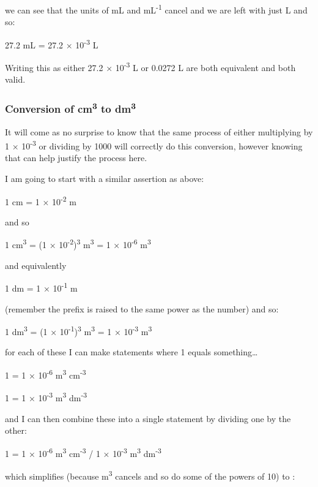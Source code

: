 \documentclass[
]{book}
\begin{document}
we can see that the units of mL and mL\textsuperscript{-1} cancel and we are left with just L and so:

27.2 mL = 27.2 × 10\textsuperscript{-3} L

Writing this as either 27.2 × 10\textsuperscript{-3} L or 0.0272 L are both equivalent and both valid.

\hypertarget{conversion-of-cm3-to-dm3}{%
\subsubsection{\texorpdfstring{Conversion of cm\textsuperscript{3} to dm\textsuperscript{3}}{Conversion of cm3 to dm3}}\label{conversion-of-cm3-to-dm3}}

It will come as no surprise to know that the same process of either multiplying by 1 × 10\textsuperscript{-3} or dividing by 1000 will correctly do this conversion, however knowing that can help justify the process here.

I am going to start with a similar assertion as above:

1 cm = 1 × 10\textsuperscript{-2} m

and so

1 cm\textsuperscript{3} = (1 × 10\textsuperscript{-2})\textsuperscript{3} m\textsuperscript{3} = 1 × 10\textsuperscript{-6} m\textsuperscript{3}

and equivalently

1 dm = 1 × 10\textsuperscript{-1} m

(remember the prefix is raised to the same power as the number) and so:

1 dm\textsuperscript{3} = (1 × 10\textsuperscript{-1})\textsuperscript{3} m\textsuperscript{3} = 1 × 10\textsuperscript{-3} m\textsuperscript{3}

for each of these I can make statements where 1 equals something\ldots{}

1 = 1 × 10\textsuperscript{-6} m\textsuperscript{3} cm\textsuperscript{-3}

1 = 1 × 10\textsuperscript{-3} m\textsuperscript{3} dm\textsuperscript{-3}

and I can then combine these into a single statement by dividing one by the other:

1 = 1 × 10\textsuperscript{-6} m\textsuperscript{3} cm\textsuperscript{-3} / 1 × 10\textsuperscript{-3} m\textsuperscript{3} dm\textsuperscript{-3}

which simplifies (because m\textsuperscript{3} cancels and so do some of the powers of 10) to :
\end{document}
